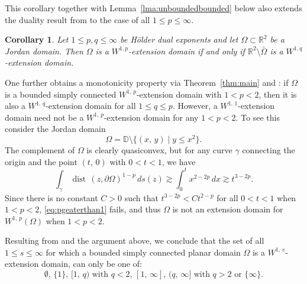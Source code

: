 \documentclass[reqno,11pt]{amsart}
\makeatletter
\def\rr{{\mathbb R}}
\def\dist{{\mathop\mathrm{\,dist\,}}}
\newtheorem{cor}[thm]{Corollary}%
\numberwithin{equation}{section}
\theoremstyle{remark}
\makeatother
\begin{document}
This corollary together with 
Lemma~\ref{lma:unboundedbounded} below  also extends the duality result from 
\cite[Corollary 1.3]{KRZ2015} to the case of all $1\le p\le \infty.$

\begin{cor}\label{cor:dual}
 Let $1 \le p,q \le \infty$ be H\"older dual exponents and let 
$\Omega \subset \rr^2$ be a Jordan
 domain. Then $\Omega$ is a $W^{1,p}$-extension domain if and only if 
 $\rr^2 \setminus \bar\Omega$ is a $W^{1,q}$-extension domain.
\end{cor}

One further obtains a monotonicity property via  Theorem~\ref{thm:main} and 
\cite{KRZ2015}: if $\Omega$ is a bounded 
simply connected $W^{1,\,p}$-extension domain with $1<p<2$, 
then it is also a $W^{1,\,q}$-extension domain for all $1\le q\le p.$ 
However, a 
$W^{1,\,1}$-extension domain need not  be a $W^{1,\,p}$-extension domain for 
any $1<p<2$. To see this consider the Jordan domain
$$\Omega=\mathbb D\setminus\{(x,\,y)\mid y\le x^2\}.$$ 
The complement of $\Omega$ is clearly quasiconvex, but for any curve 
$\gamma$ connecting the origin and the point $(t,\,0)$ with $0<t<1$, we have 
$$ \int_\gamma \dist(z,\partial \Omega)^{1-p}\,ds(z)\gtrsim \int_{0}^t  x^{2-2p}\, dx\gtrsim t^{3-2p}. $$
Since there is no constant $C>0$ such that  $t^{3-2p}<C t^{2-p}$ for all 
$0<t<1$ when $1<p<2$,  \eqref{eq:pgeaterthan1} fails, and thus $\Omega$ is not 
an extension domain for $W^{1,\,p}(\Omega)$ when  $1<p<2$. 



Resulting from \cite[Corollary 1.5]{KRZ2015} and the argument above, we 
conclude that the set of all $1\le s \le\infty$ for which a bounded simply 
connected planar domain $\Omega$ is a $W^{1,\,s}$-extension domain, can only 
be one of:
$$\text{$\emptyset$, $\{1\}$, $[1,\,q)$ with $q<2$, $[1,\,\infty]$,  $(q,\,\infty]$ with $q> 2$ or $\{\infty\}$.}$$ 
\end{document}
